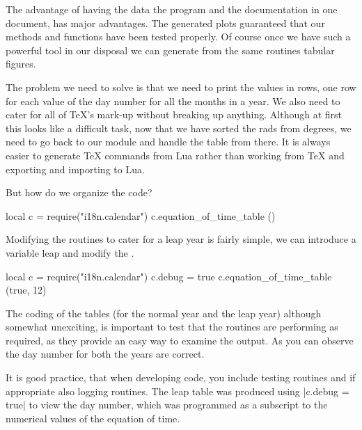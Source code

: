The advantage of having the data the program and the documentation in one document, has major advantages. The generated plots guaranteed that our methods and functions have been tested properly. Of course once we have such a powerful tool in our disposal we can generate from the same routines tabular figures. 



The problem we need to solve is that we need to print the values in rows, one row for each value of the day number for all the months in a year. We also need to cater for all of TeX's mark-up without breaking up anything. Although at first this looks like a difficult task, now that we have sorted the rads from degrees, we need to go back to our module and handle the table from there. It is always easier to generate TeX commands from Lua rather than working from TeX and exporting and importing to Lua.

But how do we organize the code? 


\begin{scriptexample}{}{}
\bgroup
\scriptsize
\begin{luacode}
local c = require("i18n.calendar") 
c.equation_of_time_table ()
\end{luacode}
\egroup
\end{scriptexample}

Modifying the routines to cater for a leap year is fairly simple, we can introduce a variable leap and modify the . 


\bgroup
\footnotesize
\begin{luacode}
local c = require("i18n.calendar") 
c.debug = true
c.equation_of_time_table (true, 12)
\end{luacode}
\egroup


The coding of the tables (for the normal year and the leap year) although somewhat unexciting, is important to test that the routines are performing as required, as they provide an easy way to examine the output. As you can observe the day number for both the years are correct. 

It is good practice, that when developing code, you include testing routines and if appropriate also logging routines. The leap table was produced using |c.debug = true|  to view the day number, which was programmed as a subscript to the numerical values of the equation of time.


